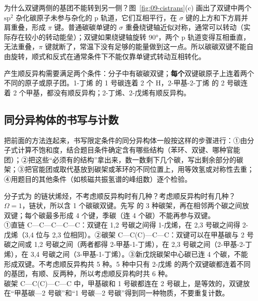 为什么双键两侧的基团不能转到另一侧？图~\ref{fig:09-cistrans}(c) 画出了双键中两个 $\mathrm{sp}^2$ 杂化碳原子未参与杂化的 p 轨道，它们互相平行，在 $\sigma$ 键的上方和下方肩并肩重叠，形成 $\pi$ 键。普通碳碳单键的 $\sigma$ 重叠绕键轴近似对称，通常可以转动（实际存在较小的转动能垒）；双键如果绕键轴旋转 90°，两个 p 轨道变得互相垂直，无法重叠，$\pi$ 键就断了，常温下没有足够的能量做到这一点。所以碳碳双键不能自由旋转，顺式和反式在通常条件下不能仅靠单键式转动互相转化。

产生顺反异构需要满足两个条件：分子中有碳碳双键；\textbf{每个}双键碳原子上连着两个不同的原子或原子团。1-丁烯  的 1 号碳连着 2 个 H，2-甲基-2-丁烯  的 2 号碳连着 2 个甲基，都没有顺反异构；2-丁烯、2-戊烯有顺反异构。

\subsection{同分异构体的书写与计数}
把前面的方法连起来，书写限定条件的同分异构体一般按这样的步骤进行：①由分子式计算不饱和度，结合题目条件确定含有哪些结构（苯环、双键、哪种官能团）；②把这些“必须有的结构”拿出来，数一数剩下几个碳，写出剩余部分的碳架；③把官能团或取代基放到碳架或苯环的不同位置上，用等效氢或对称性去重；④用题目的其他条件（如核磁共振氢谱的峰组数）逐个检验。

\begin{liti}[典型]
分子式为  的链状烯烃，不考虑顺反异构时有几种？考虑顺反异构时有几种？
\tcblower
\silu $\Omega=1$，链状，所以含 1 个碳碳双键。先写  的 3 种碳架，再在相邻两个碳之间放双键；每个碳最多形成 4 个键，季碳（连 4 个碳）不能再参与双键。\\
\jie ①直链 C—C—C—C—C：双键在 1,2 号碳之间得 1-戊烯，在 2,3 号碳之间得 2-戊烯（3,4 位与 2,3 位相同）。②碳架 C—C(C)—C—C：双键可以在甲基碳与 2 号碳之间或 1,2 号碳之间（两者都得 2-甲基-1-丁烯），在 2,3 号碳之间（2-甲基-2-丁烯），在 3,4 号碳之间（3-甲基-1-丁烯）。③新戊烷碳架中心碳已连 4 个碳，不能形成双键。不考虑顺反异构共 5 种。5 种中只有 2-戊烯  的两个双键碳都连着不同的基团，有顺、反两种，所以考虑顺反异构时共 6 种。\\
\xianjing 碳架 C—C(C)—C—C 中，甲基碳和 1 号碳都连在 2 号碳上，是等效的，双键放在“甲基碳—2 号碳”和“1 号碳—2 号碳”得到同一种物质，不要重复计数。
\end{liti}

